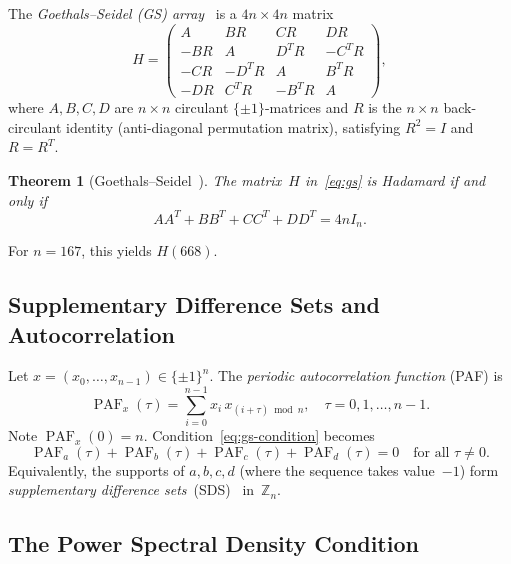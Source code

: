 \documentclass[11pt,a4paper]{article}
\newtheorem{theorem}{Theorem}
\newcommand{\ZZ}{\mathbb{Z}}
\DeclareMathOperator{\PAF}{PAF}
\begin{document}
The \emph{Goethals--Seidel (GS) array}~\cite{goethals1967orthogonal} is a
$4n \times 4n$ matrix
\begin{equation}\label{eq:gs}
  H = \begin{pmatrix}
    A   & BR  & CR  & DR  \\
    -BR & A   & D^TR & -C^TR \\
    -CR & -D^TR & A   & B^TR \\
    -DR & C^TR & -B^TR & A
  \end{pmatrix},
\end{equation}
where $A,B,C,D$ are $n \times n$ circulant $\{\pm1\}$-matrices and $R$ is
the $n \times n$ back-circulant identity (anti-diagonal permutation
matrix), satisfying $R^2 = I$ and $R = R^T$.

\begin{theorem}[Goethals--Seidel~\cite{goethals1967orthogonal}]
  The matrix~$H$ in~\eqref{eq:gs} is Hadamard if and only if
  \begin{equation}\label{eq:gs-condition}
    AA^T + BB^T + CC^T + DD^T = 4nI_n.
  \end{equation}
\end{theorem}

For $n = 167$, this yields $H(668)$.

\subsection{Supplementary Difference Sets and Autocorrelation}

Let $x = (x_0, \ldots, x_{n-1}) \in \{\pm1\}^n$.  The \emph{periodic
autocorrelation function} (PAF) is
\begin{equation}\label{eq:paf}
  \PAF_x(\tau) = \sum_{i=0}^{n-1} x_i \, x_{(i+\tau) \bmod n},
  \quad \tau = 0, 1, \ldots, n-1.
\end{equation}
Note $\PAF_x(0) = n$.  Condition~\eqref{eq:gs-condition} becomes
\begin{equation}\label{eq:paf-condition}
  \PAF_a(\tau) + \PAF_b(\tau) + \PAF_c(\tau) + \PAF_d(\tau) = 0
  \quad \text{for all } \tau \neq 0.
\end{equation}
Equivalently, the supports of $a,b,c,d$ (where the sequence takes
value~$-1$) form \emph{supplementary difference
sets}~(SDS)~\cite{djokovic2009sds,seberry1992hadamard} in~$\ZZ_n$.

\subsection{The Power Spectral Density Condition}\label{sec:psd}
\end{document}
